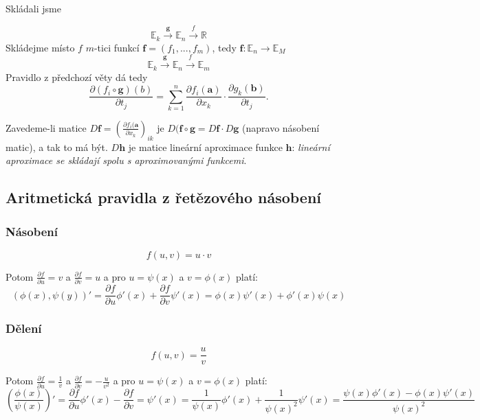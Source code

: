 \documentclass[10pt]{article}
\begin{document}
Skládali jsme

\[\mathbb{E}_k \xrightarrow{\mathbf{g}} \mathbb{E}_n \xrightarrow{\textit{f}} \mathbb{R} \]
Skládejme místo $f$ $m$-tici funkcí
$\mathbf{f} = (f_1,...,f_m)$, tedy $\mathbf{f}: \mathbb{E}_n \rightarrow \mathbb{E}_M$
\[\mathbb{E}_k \xrightarrow{\mathbf{g}} \mathbb{E}_n \xrightarrow{\textit{f}} \mathbb{E}_m \]
Pravidlo z předchozí věty dá tedy
\[\frac{\partial (f_i \circ \mathbf{g})(b)}{\partial t_j} = \sum^n_{k=1} \frac{\partial f_i(\mathbf{a})}{\partial x_k}
\cdot \frac{\partial g_k(\mathbf{b})}{\partial t_j}.\]

Zavedeme-li matice $D\mathbf{f} = \left(\frac{\partial f_i(\mathbf{a}}{\partial x_k}\right)_{ik}$ je 
$D(\mathbf{f}\circ \mathbf{g} = D\mathbf{f}\cdot D\mathbf{g}$ (napravo násobení matic), a tak to má být. $D\mathbf{h}$ je matice lineární aproximace 
funkce $\mathbf{h}$: \textit{lineární aproximace se skládají spolu s aproximovanými funkcemi}.
\noindent

\subsection{Aritmetická pravidla z řetězového násobení}
\subsubsection{Násobení}
\[ f(u,v) = u \cdot v \]

\hspace{1.2mm}
\noindent
Potom $ \frac{\partial f}{\partial u} = v $ a $ \frac{\partial f}{\partial v} = u $
a pro $u = \psi (x)$ a $ v = \phi (x) $ platí:
\[ (\phi (x), \psi (y))' =
\frac{\partial f}{\partial u} \phi '(x) + \frac{\partial f}{\partial v} \psi '(x) = 
\phi (x)\psi '(x) + \phi '(x)\psi (x)  \]

\subsubsection{Dělení}
\[ f(u,v) = \frac{u}{v} \]

\hspace{1.2mm}
\noindent
Potom $ \frac{\partial f}{\partial u} = \frac{1}{v} $ a $ \frac{\partial f}{\partial v} = -\frac{u}{v^2} $
a pro $u = \psi (x)$ a $ v = \phi (x) $ platí:
\[ \left( \frac{\phi (x)}{\psi (x)} \right)' =
\frac{\partial f}{\partial u} \phi '(x) - \frac{\partial f}{\partial v} = \psi '(x) =
\frac{1}{\psi (x)} \phi '(x) + \frac{1}{\psi (x)^2}\psi '(x) =
\frac{\psi (x)\phi '(x) - \phi (x)\psi '(x)}{\psi (x)^2} \]
\end{document}
